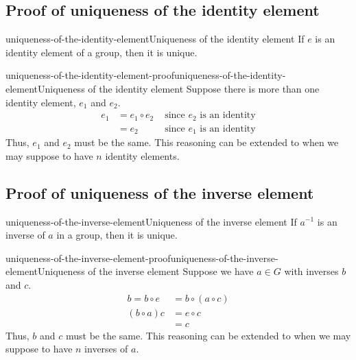 \documentclass[preview]{standalone}
\begin{document}
\subsection{Proof of uniqueness of the identity element}

\begin{snippettheorem}{uniqueness-of-the-identity-element}{Uniqueness of the identity element}
    If \(e\) is an identity element of a group, then it is unique.
\end{snippettheorem}

\begin{snippetproof}{uniqueness-of-the-identity-element-proof}{uniqueness-of-the-identity-element}{Uniqueness of the identity element}
    Suppose there is more than one identity element, \(e_1\) and \(e_2\).
    \begin{align*}
        e_1 &= e_1 \circ e_2 &\text { since \(e_2\) is an identity} \\
        &= e_2 &\text { since \(e_1\) is an identity}
    \end{align*}
    Thus, \(e_1\) and \(e_2\) must be the same. This reasoning can be extended
    to when we may suppose to have \(n\) identity elements.
\end{snippetproof}

\subsection{Proof of uniqueness of the inverse element}

\begin{snippettheorem}{uniqueness-of-the-inverse-element}{Uniqueness of the inverse element}
    If \(a^{-1}\) is an inverse of \(a\) in a group, then it is unique.
\end{snippettheorem}

\begin{snippetproof}{uniqueness-of-the-inverse-element-proof}{uniqueness-of-the-inverse-element}{Uniqueness of the inverse element}
    Suppose we have \(a\in G\) with inverses \(b\) and \(c\).
    \begin{align*}
        b = b \circ e &= b \circ (a \circ c)\\
        (b \circ a) c &= e \circ c \\
        &= c
    \end{align*}
    Thus, \(b\) and \(c\) must be the same. This reasoning can be extended
    to when we may suppose to have \(n\) inverses of \(a\).
\end{snippetproof}
\end{document}
